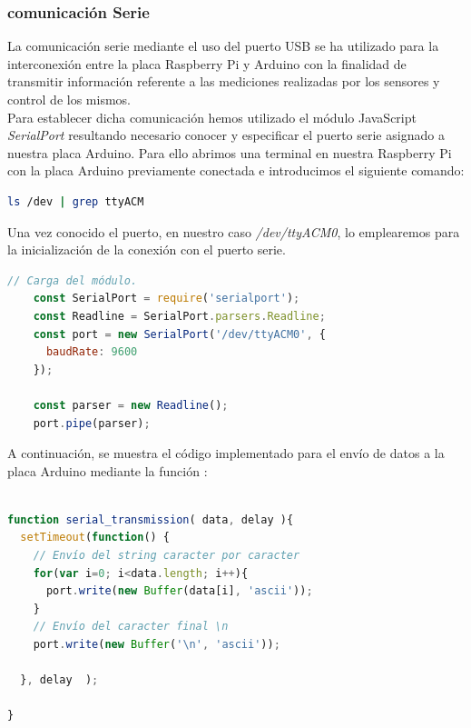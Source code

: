 \subsubsection{comunicación Serie}
\label{subsec:raspberry_serie}

La comunicación serie mediante el uso del puerto USB se ha utilizado para la interconexión entre la placa Raspberry Pi y Arduino con la finalidad de transmitir información referente
a las mediciones realizadas por los sensores y control de los mismos.\\

Para establecer dicha comunicación hemos utilizado el módulo JavaScript \emph{SerialPort} resultando necesario conocer y especificar el puerto serie asignado a nuestra placa Arduino. 
Para ello abrimos una terminal en nuestra Raspberry Pi con la placa Arduino previamente conectada e introducimos el siguiente comando:\\

\begin{lstlisting}[language=bash]
ls /dev | grep ttyACM
\end{lstlisting}

Una vez conocido el puerto, en nuestro caso \emph{/dev/ttyACM0}, lo emplearemos para la inicialización de la conexión con el puerto serie.\\

\begin{lstlisting}[language=JavaScript]
    // Carga del módulo.
    const SerialPort = require('serialport');
    const Readline = SerialPort.parsers.Readline;
    const port = new SerialPort('/dev/ttyACM0', {
      baudRate: 9600
    });
    
    const parser = new Readline();
    port.pipe(parser);
\end{lstlisting}


A continuación, se muestra el código implementado para el envío de datos a la placa Arduino mediante la función :\\

\begin{lstlisting}[language=JavaScript]

function serial_transmission( data, delay ){
  setTimeout(function() {
    // Envío del string caracter por caracter
    for(var i=0; i<data.length; i++){
      port.write(new Buffer(data[i], 'ascii'));
    }
    // Envío del caracter final \n
    port.write(new Buffer('\n', 'ascii'));

  }, delay  );

}
\end{lstlisting}

